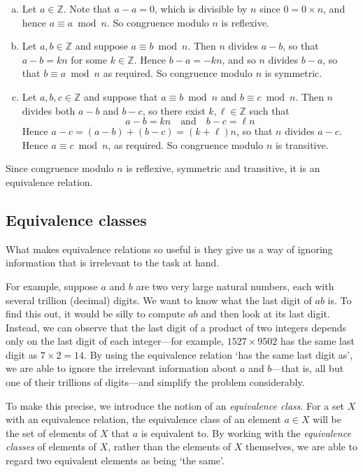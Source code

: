 \begin{cproof}
\fixlistskip
\begin{enumerate}[(a)]
\item Let $a \in \mathbb{Z}$. Note that $a-a=0$, which is divisible by $n$ since $0 = 0 \times n$, and hence $a \equiv a \bmod n$. So congruence modulo $n$ is reflexive.
\item Let $a,b \in \mathbb{Z}$ and suppose $a \equiv b \bmod n$. Then $n$ divides $a-b$, so that $a-b = kn$ for some $k \in \mathbb{Z}$. Hence $b-a=-kn$, and so $n$ divides $b-a$, so that $b \equiv a \bmod n$ as required. So congruence modulo $n$ is symmetric.
\item Let $a,b,c \in \mathbb{Z}$ and suppose that $a \equiv b \bmod n$ and $b \equiv c \bmod n$. Then $n$ divides both $a-b$ and $b-c$, so there exist $k, \ell \in \mathbb{Z}$ such that
\[ a-b = kn \quad \text{and} \quad b-c = \ell n \]
Hence $a-c = (a-b)+(b-c) = (k+\ell)n$, so that $n$ divides $a-c$. Hence $a \equiv c \bmod n$, as required. So congruence modulo $n$ is transitive.
\end{enumerate}
Since congruence modulo $n$ is reflexive, symmetric and transitive, it is an equivalence relation.
\end{cproof}

\subsection*{Equivalence classes}

What makes equivalence relations so useful is they give us a way of ignoring information that is irrelevant to the task at hand.

For example, suppose $a$ and $b$ are two very large natural numbers, each with several trillion (decimal) digits. We want to know what the last digit of $ab$ is. To find this out, it would be silly to compute $ab$ and then look at its last digit. Instead, we can observe that the last digit of a product of two integers depends only on the last digit of each integer---for example, $1527 \times 9502$ has the same last digit as $7 \times 2 = 14$. By using the equivalence relation `has the same last digit as', we are able to ignore the irrelevant information about $a$ and $b$---that is, all but one of their trillions of digits---and simplify the problem considerably.

To make this precise, we introduce the notion of an \textit{equivalence class}. For a set $X$ with an equivalence relation, the equivalence class of an element $a \in X$ will be the set of elements of $X$ that $a$ is equivalent to. By working with the \textit{equivalence classes} of elements of $X$, rather than the elements of $X$ themselves, we are able to regard two equivalent elements as being `the same'.

